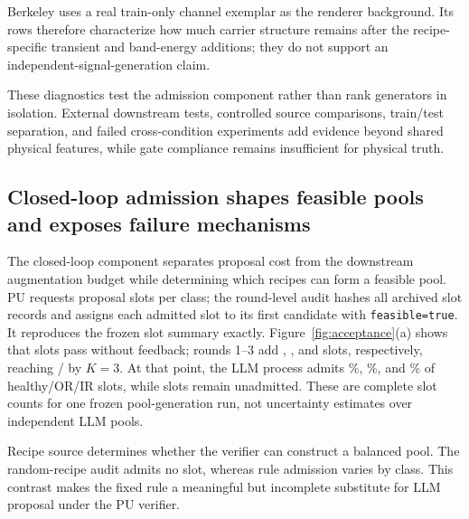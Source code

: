 \documentclass[a4paper,fleqn]{cas-sc}
\begin{document}


Berkeley uses a real train-only channel exemplar as the renderer background.
Its rows therefore characterize how much carrier structure remains after the
recipe-specific transient and band-energy additions; they do not support an
independent-signal-generation claim.

These diagnostics test the admission component rather than rank generators in
isolation. External downstream tests, controlled source comparisons, train/test
separation, and failed cross-condition experiments add evidence beyond shared
physical features, while gate compliance remains insufficient for physical
truth.

\subsection{Closed-loop admission shapes feasible pools and exposes failure
mechanisms}

The closed-loop component separates proposal cost from the downstream
augmentation budget while determining which recipes can form a feasible pool.
PU requests \BreezeProposalSlotsPerClass{} proposal slots per class;
the round-level audit hashes all \BreezeTotalProposalSlots{} archived slot
records and assigns each
admitted slot to its first candidate with \texttt{feasible=true}. It reproduces
the frozen slot summary exactly. Figure~\ref{fig:acceptance}(a) shows that
\BreezeAdmissionKZeroCumulative{} slots pass without feedback; rounds 1--3 add
\BreezeAdmissionKOneIncrement{}, \BreezeAdmissionKTwoIncrement{}, and
\BreezeAdmissionKThreeIncrement{} slots, respectively, reaching
\BreezeAdmissionKThreeCumulative{}/\BreezeTotalProposalSlots{} by $K=3$. At that point, the LLM process admits
\BreezeHealthyAdmissionRate\%, \BreezeORAdmissionRate\%, and
\BreezeIRAdmissionRate\% of healthy/OR/IR slots, while
\BreezeAdmissionKThreeUnadmitted{} slots remain unadmitted. These are complete
slot counts for one frozen pool-generation run, not uncertainty estimates over
independent LLM pools.

Recipe source determines whether the verifier can construct a balanced pool.
The random-recipe audit admits no slot, whereas rule admission varies by class.
This contrast makes the fixed rule a meaningful but incomplete substitute for
LLM proposal under the PU verifier.
\end{document}
